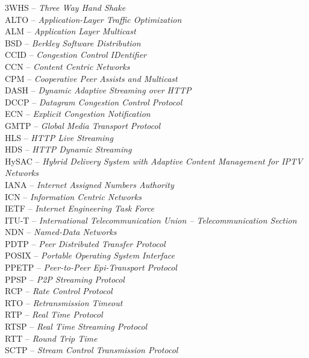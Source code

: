 3WHS		-- \textit{Three Way Hand Shake}\\
ALTO		-- \textit{Application-Layer Traffic Optimization}\\
ALM		-- \textit{Application Layer Multicast}\\
BSD		-- \textit{Berkley Software Distribution}\\
CCID		-- \textit{Congestion Control IDentifier}\\
CCN		-- \textit{Content Centric Networks}\\
CPM		-- \textit{Cooperative Peer Assists and Multicast}\\
DASH		-- \textit{Dynamic Adaptive Streaming over HTTP}\\
DCCP		-- \textit{Datagram Congestion Control Protocol}\\
ECN		-- \textit{Explicit Congestion Notification}\\
GMTP		-- \textit{Global Media Transport Protocol}\\
HLS		-- \textit{HTTP Live Streaming}\\
HDS		-- \textit{HTTP Dynamic Streaming}\\
HySAC		-- \textit{Hybrid Delivery System with Adaptive Content Management
for IPTV Networks}\\
IANA		-- \textit{Internet Assigned Numbers Authority}\\
ICN		-- \textit{Information Centric Networks}\\
IETF		-- \textit{Internet Engineering Task Force}\\
ITU-T		-- \textit{International Telecommunication Union --
Telecommunication Section}\\
NDN		-- \textit{Named-Data Networks}\\
PDTP		-- \textit{Peer Distributed Transfer Protocol}\\
POSIX		-- \textit{Portable Operating System Interface}\\
PPETP		-- \textit{Peer-to-Peer Epi-Transport Protocol}\\
PPSP		-- \textit{P2P Streaming Protocol}\\
RCP		-- \textit{Rate Control Protocol}\\
RTO		-- \textit{Retransmission Timeout}\\
RTP		-- \textit{Real Time Protocol}\\
RTSP		-- \textit{Real Time Streaming Protocol}\\
RTT		-- \textit{Round Trip Time}\\
SCTP		-- \textit{Stream Control Transmission Protocol}\\
